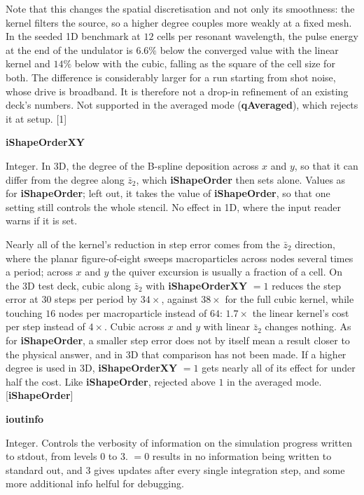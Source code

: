 \documentclass[12pt]{article}%
\begin{document}
Note that this changes the spatial discretisation and not only its smoothness: the kernel filters the source, so a higher degree couples more weakly at a fixed mesh. In the seeded 1D benchmark at $12$ cells per resonant wavelength, the pulse energy at the end of the undulator is $6.6\%$ below the converged value with the linear kernel and $14\%$ below with the cubic, falling as the square of the cell size for both. The difference is considerably larger for a run starting from shot noise, whose drive is broadband. It is therefore not a drop-in refinement of an existing deck's numbers. Not supported in the averaged mode ({\bf qAveraged}), which rejects it at setup. [1]

{\bf iShapeOrderXY}

Integer. In 3D, the degree of the B-spline deposition across $x$ and $y$, so that it can differ from the degree along $\bar{z}_2$, which {\bf iShapeOrder} then sets alone. Values as for {\bf iShapeOrder}; left out, it takes the value of {\bf iShapeOrder}, so that one setting still controls the whole stencil. No effect in 1D, where the input reader warns if it is set.

Nearly all of the kernel's reduction in step error comes from the $\bar{z}_2$ direction, where the planar figure-of-eight sweeps macroparticles across nodes several times a period; across $x$ and $y$ the quiver excursion is usually a fraction of a cell. On the 3D test deck, cubic along $\bar{z}_2$ with {\bf iShapeOrderXY} $=1$ reduces the step error at $30$ steps per period by $34\times$, against $38\times$ for the full cubic kernel, while touching $16$ nodes per macroparticle instead of $64$: $1.7\times$ the linear kernel's cost per step instead of $4\times$. Cubic across $x$ and $y$ with linear $\bar{z}_2$ changes nothing. As for {\bf iShapeOrder}, a smaller step error does not by itself mean a result closer to the physical answer, and in 3D that comparison has not been made. If a higher degree is used in 3D, {\bf iShapeOrderXY} $=1$ gets nearly all of its effect for under half the cost. Like {\bf iShapeOrder}, rejected above $1$ in the averaged mode. [{\bf iShapeOrder}]

{\bf ioutinfo}

Integer. Controls the verbosity of information on the simulation progress written to stdout, from levels $0$ to $3$. $=0$ results in no information being written to standard out, and $3$ gives updates after every single integration step, and some more additional info helful for debugging.
\end{document}
